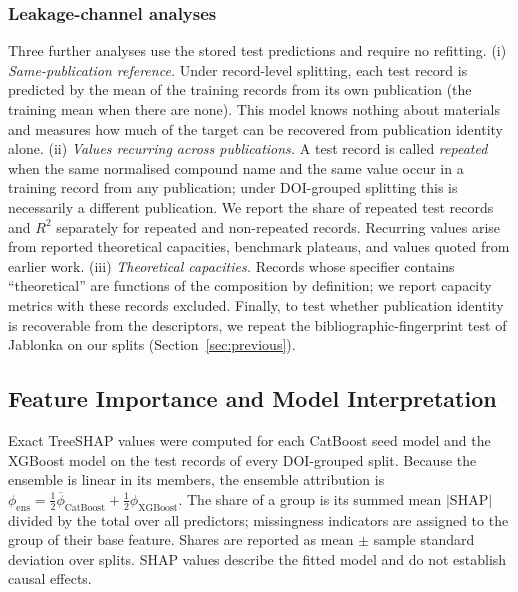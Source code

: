 \documentclass[journal=jcisd8,manuscript=article,layout=traditional]{achemso}
\begin{document}
\subsubsection{Leakage-channel analyses}
\label{sec:channels_methods}

Three further analyses use the stored test predictions and require no refitting. (i) \emph{Same-publication reference.} Under record-level splitting, each test record is predicted by the mean of the training records from its own publication (the training mean when there are none). This model knows nothing about materials and measures how much of the target can be recovered from publication identity alone. (ii) \emph{Values recurring across publications.} A test record is called \emph{repeated} when the same normalised compound name and the same value occur in a training record from any publication; under DOI-grouped splitting this is necessarily a different publication. We report the share of repeated test records and $R^2$ separately for repeated and non-repeated records. Recurring values arise from reported theoretical capacities, benchmark plateaus, and values quoted from earlier work. (iii) \emph{Theoretical capacities.} Records whose specifier contains ``theoretical'' are functions of the composition by definition; we report capacity metrics with these records excluded. Finally, to test whether publication identity is recoverable from the descriptors, we repeat the bibliographic-fingerprint test of Jablonka \cite{jablonka2026clever} on our splits (Section~\ref{sec:previous}).

\subsection{Feature Importance and Model Interpretation}
\label{sec:shap_methods}

Exact TreeSHAP values \cite{shappaper,lundberg2020treeshap} were computed for each CatBoost seed model and the XGBoost model on the test records of every DOI-grouped split. Because the ensemble is linear in its members, the ensemble attribution is $\phi_{\mathrm{ens}} = \tfrac12\overline{\phi}_{\mathrm{CatBoost}} + \tfrac12\phi_{\mathrm{XGBoost}}$. The share of a group is its summed mean $|$SHAP$|$ divided by the total over all predictors; missingness indicators are assigned to the group of their base feature. Shares are reported as mean $\pm$ sample standard deviation over splits. SHAP values describe the fitted model and do not establish causal effects.
\end{document}
